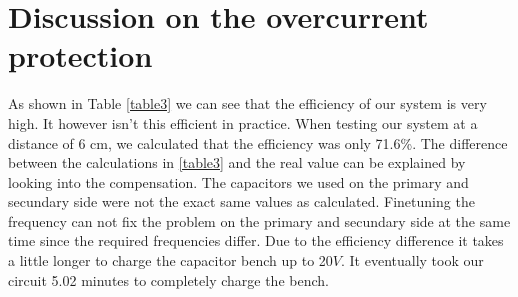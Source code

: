 \documentclass[final]{scrreprt} %
\begin{document}
\chapter{Discussion on the overcurrent protection}

As shown in Table \ref{table3} we can see that the efficiency of our system is very high. 
It however isn't this efficient in practice.
When testing our system at a distance of 6 cm, we calculated that the efficiency was only 71.6\%.
The difference between the calculations in \ref{table3} and the real value can be explained by looking into the compensation. 
The capacitors we used on the primary and secundary side were not the exact same values as calculated.
Finetuning the frequency can not fix the problem on the primary and secundary side at the same time since the required frequencies differ. 
Due to the efficiency difference it takes a little longer to charge the capacitor bench up to 20$V$.
It eventually took our circuit 5.02 minutes to completely charge the bench. 
\end{document}
